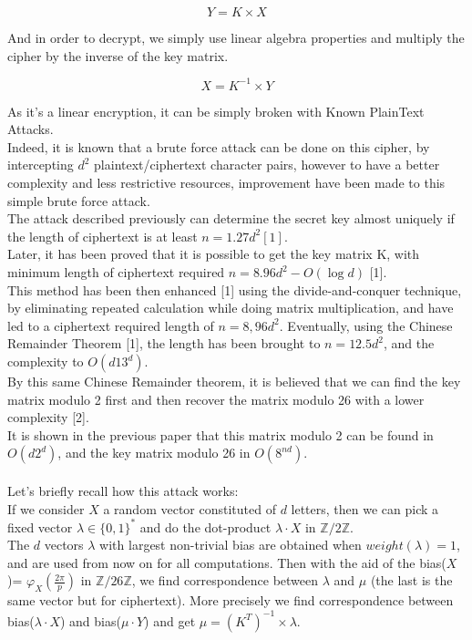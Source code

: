 \documentclass{article}
\begin{document}
$$Y=K \times X$$

And in order to decrypt, we simply use linear algebra properties and multiply the cipher by the inverse of the key matrix.

$$X = K^{-1} \times Y$$

As it's a linear encryption, it can be simply broken with Known PlainText Attacks.\\
Indeed, it is known that a brute force attack can be done on this cipher, by intercepting $d^2$ plaintext/ciphertext character pairs, however to have a better complexity and less restrictive resources, improvement have been made to this simple brute force attack.\\
The attack described previously can determine the secret key almost uniquely if the length of ciphertext is at least $n =1.27d^2 [1].$\\ 
Later, it has been proved that it is possible to get the key matrix K, with minimum length of ciphertext required $n =8.96d^2 -O(\log d)$ [1].\\
This method has been then enhanced [1] using the divide-and-conquer technique, by eliminating repeated calculation while doing matrix multiplication, and have led to a ciphertext required length of $n=8,96d^2$. Eventually, using the Chinese Remainder Theorem [1], the length has been brought to $n=12.5d^2$, and the complexity to $O(d13^d)$.\\
By this same Chinese Remainder theorem, it is believed that we can find the key matrix modulo 2 first and then recover the matrix modulo 26 with a lower complexity [2].\\
It is shown in the previous paper that this matrix modulo 2 can be found in $O(d2^d)$, and the key matrix modulo 26 in $O(8^{nd})$.\\
\\
Let's briefly recall how this attack works:\\
If we consider $X$ a random vector constituted of $d$ letters, then we can pick a fixed vector $\lambda \in \{0,1\}^*$ and do the dot-product $\lambda \cdot X$ in $\mathbb{Z}/2\mathbb{Z}$.\\
The $d$ vectors $\lambda$ with largest non-trivial bias are obtained when $weight(\lambda) = 1$, and are used from now on for all computations.
Then with the aid of the bias($X$)= $\varphi_{X}(\frac{2\pi}{p})$ in $\mathbb{Z}/26\mathbb{Z}$, we find correspondence between $\lambda$ and $\mu$ (the last is the same vector but for ciphertext). More precisely we find correspondence between bias($\lambda \cdot X$) and bias($\mu \cdot Y$) and get $ \mu = (K^T)^{-1} \times\lambda $.\\
\end{document}
